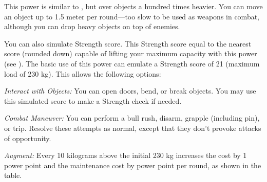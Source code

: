 {
	This power is similar to , but over objects a hundred times heavier. You can move an object up to 1.5 meter per round---too slow to be used as weapons in combat, although you can drop heavy objects on top of enemies.

	You can also simulate Strength score. This Strength score equal to the nearest score (rounded down) capable of lifting your maximum capacity with this power (see ). The basic use of this power can emulate a Strength score of 21 (maximum load of 230 kg). This allows the following options:
	\begin{itemize*}
	\item \textit{Interact with Objects:} You can open doors, bend, or break objects. You may use this simulated score to make a Strength check if needed.
	\item \textit{Combat Maneuver:} You can perform a bull rush, disarm, grapple (including pin), or trip. Resolve these attempts as normal, except that they don't provoke attacks of opportunity.
	\end{itemize*}

	\textit{Augment:} Every 10 kilograms above the initial 230 kg increases the cost by 1 power point and the maintenance cost by \onehalf power point per round, as shown in the table. 

}